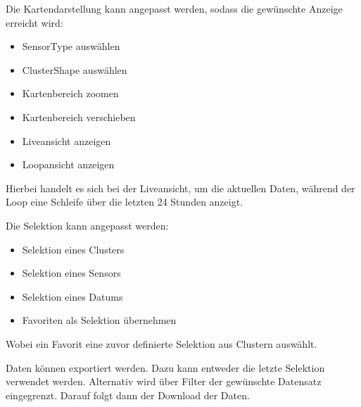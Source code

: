        Die Kartendarstellung kann angepasst werden, sodass die gewünschte Anzeige erreicht wird:
        \begin{itemize}
            \item SensorType auswählen
            \item ClusterShape auswählen
            \item Kartenbereich zoomen
            \item Kartenbereich verschieben
            \item Liveansicht anzeigen
            \item Loopansicht anzeigen
        \end{itemize}
        Hierbei handelt es sich bei der Liveansicht, um die aktuellen Daten, während der Loop eine Schleife über die letzten 24 Stunden anzeigt.

        Die Selektion kann angepasst werden:
        \begin{itemize}
            \item Selektion eines Clusters
            \item Selektion eines Sensors
            \item Selektion eines Datums
            \item Favoriten als Selektion übernehmen
        \end{itemize}
        Wobei ein Favorit eine zuvor definierte Selektion aus Clustern auswählt.

        Daten können exportiert werden. Dazu kann entweder die letzte Selektion verwendet werden. Alternativ wird über Filter der gewünschte Datensatz eingegrenzt. Darauf folgt dann der Download der Daten.


        
